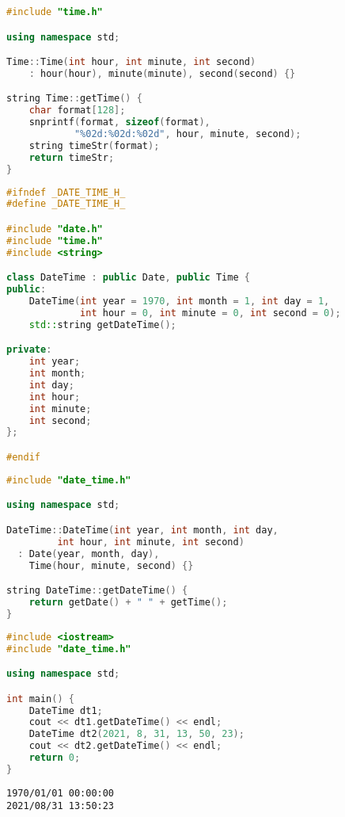 \begin{lstlisting}[language=C++, title=time.cpp]
#include "time.h"

using namespace std;

Time::Time(int hour, int minute, int second)
    : hour(hour), minute(minute), second(second) {}

string Time::getTime() {
    char format[128];
    snprintf(format, sizeof(format), 
            "%02d:%02d:%02d", hour, minute, second);
    string timeStr(format);
    return timeStr;
}
\end{lstlisting}

\begin{lstlisting}[language=C++, title=date\_time.h]
#ifndef _DATE_TIME_H_
#define _DATE_TIME_H_

#include "date.h"
#include "time.h"
#include <string>

class DateTime : public Date, public Time {
public:
    DateTime(int year = 1970, int month = 1, int day = 1,
             int hour = 0, int minute = 0, int second = 0);
    std::string getDateTime();

private:
    int year;
    int month;
    int day;
    int hour;
    int minute;
    int second;
};

#endif
\end{lstlisting}

\begin{lstlisting}[language=C++, title=date\_time.cpp]
#include "date_time.h"

using namespace std;

DateTime::DateTime(int year, int month, int day,
         int hour, int minute, int second)
  : Date(year, month, day),
    Time(hour, minute, second) {}

string DateTime::getDateTime() {
    return getDate() + " " + getTime();
}
\end{lstlisting}

\begin{lstlisting}[language=C++, title=test\_date\_time.cpp]
#include <iostream>
#include "date_time.h"

using namespace std;

int main() {
    DateTime dt1;
    cout << dt1.getDateTime() << endl;
    DateTime dt2(2021, 8, 31, 13, 50, 23);
    cout << dt2.getDateTime() << endl;
    return 0;
}
\end{lstlisting}

\begin{tcolorbox}
	\begin{verbatim}
1970/01/01 00:00:00
2021/08/31 13:50:23
	\end{verbatim}
\end{tcolorbox}


